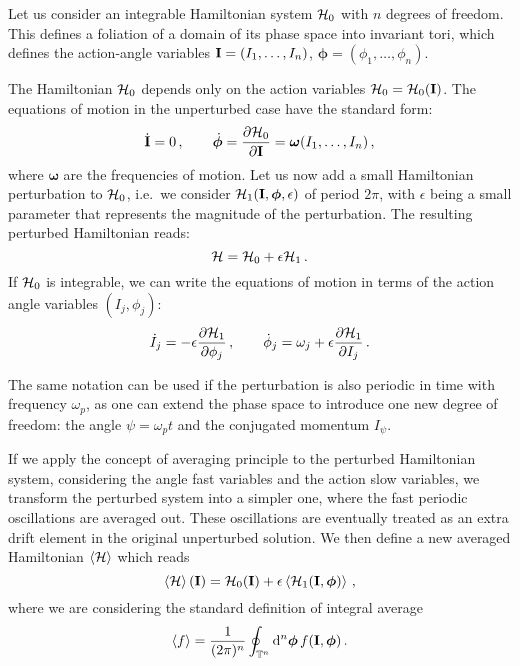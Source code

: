 Let us consider an integrable Hamiltonian system $\mathcal{H}_0$ with $n$ degrees of freedom. This defines a foliation of a domain of its phase space into invariant tori, which defines the action-angle variables $\vb{I}=(I_1, \ldots, I_n)$, $\boldsymbol{\phi}=(\phi_1, \ldots, \phi_n)$. 

The Hamiltonian $\mathcal{H}_0$ depends only on the action variables $\mathcal{H}_0=\mathcal{H}_0(\vb{I})$. The equations of motion in the unperturbed case have the standard form:
\begin{equation}
    \dot{\vb{I}}=0\,, \qquad \dot{\boldsymbol{\phi}} = \pdv{\mathcal{H}_0}{\vb{I}} = \boldsymbol{\omega}(I_1,\dots,I_n) \,,
\end{equation}
where $\boldsymbol{\omega}$ are the frequencies of motion.
Let us now add a small Hamiltonian perturbation to $\mathcal{H}_0$, i.e.\ we consider $\mathcal{H}_1(\vb{I}, \boldsymbol{\phi}, \epsilon)$ of period $2\pi$, with $\epsilon$ being a small parameter that represents the magnitude of the perturbation. The resulting perturbed Hamiltonian reads:
\begin{equation}
    \mathcal{H} = \mathcal{H}_0 + \epsilon \mathcal{H}_1\,.
\end{equation}
%
If $\mathcal{H}_0$ is integrable, we can write the equations of motion in terms of the action angle variables $(I_j,\phi_j)$:
%
\begin{equation}
    \dot I_j = -\epsilon \pdv{\mathcal{H}_1}{\phi_j}\,,\qquad
	\dot \phi_j = \omega_j + \epsilon \pdv{\mathcal{H}_1}{I_j}\, .
\end{equation}
%

The same notation can be used if the perturbation is also periodic in time with frequency $\omega_p$, as one can extend the phase space to introduce one new degree of freedom: the angle $\psi=\omega_p t$ and the conjugated momentum $I_\psi$.

If we apply the concept of averaging principle to the perturbed Hamiltonian system, considering the angle fast variables and the action slow variables,
we transform the perturbed system into a simpler one, where the fast periodic oscillations are averaged out. These oscillations are eventually treated as an extra drift element in the original unperturbed solution. We then define a new averaged Hamiltonian $\left<{\mathcal{H}}\right>$ which reads
%
\begin{equation} 
	\left<{\mathcal{H}}\right>(\vb{I}) = \mathcal{H}_0(\vb{I})+\epsilon \left<{ \mathcal{H}_1(\vb{I}, \boldsymbol{\phi}) }\right>\,,
\end{equation}
%
where we are considering the standard definition of integral average
%
\begin{equation} 
	\left<{f}\right> = \frac{1}{(2\pi)^n}\oint_{\mathbb{T}^n}\dd^n\boldsymbol{\phi}\, f(\vb{I}, \boldsymbol{\phi}) \, .
\end{equation}
%

